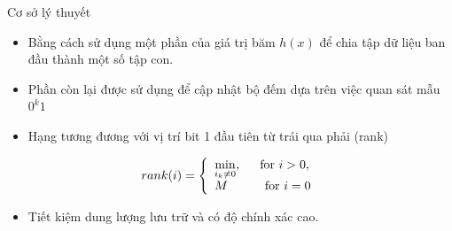 \documentclass[10pt]{beamer}
\begin{document}
\begin{frame}[fragile]{Cơ sở lý thuyết}
  \begin{itemize}
    \item Bằng cách sử dụng một phần của giá trị băm $h(x)$ để chia tập dữ liệu ban
    đầu thành một số tập con.
    \item Phần còn lại được sử dụng để cập nhật bộ đếm dựa trên việc quan sát mẫu $0^k1$
    \item Hạng tương đương với vị trí bit 1 đầu tiên từ trái qua phải (rank)
  \end{itemize}
\[
    rank(i)=\left\{
                \begin{array}{ll}
                    \min\limits_{i_k\neq 0}, \indent\text{for } i > 0,\\
                    M\indent\indent\text{for } i = 0
                \end{array}
            \right.
\]
\begin{itemize}
  \item Tiết kiệm dung lượng lưu trữ và có độ chính xác cao.
\end{itemize}
\end{frame}
\end{document}
